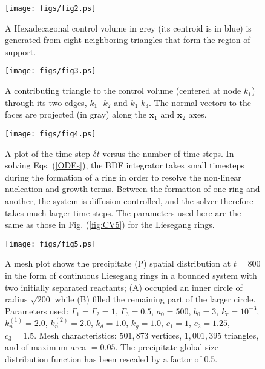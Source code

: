 \documentclass[aps,preprint]{revtex4}
\begin{document}







\newpage
\begin{figure}[htb]
\begin{center}
\texttt{[image: figs/fig2.ps]}
\end{center}
\caption{A Hexadecagonal control volume in grey (its centroid is in blue) is
generated from eight neighboring triangles that form the region of support.}
\label{fig:CV1}
\end{figure}

\begin{figure}[htb]
\begin{center}
\texttt{[image: figs/fig3.ps]}
\end{center}
\caption{A contributing triangle to the control volume (centered at node
$k_{1}$) through its two edges, $k_{1}$- $k_{2}$ and $k_{1}$-$k_{3}$. The
normal vectors to the faces are projected (in gray) along the $\mathbf{x}_{1}$
and $\mathbf{x}_{2}$ axes.}
\label{fig:CV2}
\end{figure}

\begin{figure}[htb]
\begin{center}
\texttt{[image: figs/fig4.ps]}
\end{center}
\caption{A plot of the time step $\delta t$ versus the number of time steps.
In solving Eqs. (\ref{ODEs}), the BDF integrator takes small timesteps during
the formation of a ring in order to resolve the non-linear nucleation and
growth terms. Between the formation of one ring and another, the system is
diffusion controlled, and the solver therefore takes much larger time steps.
The parameters used here are the same as those in Fig. (\ref{fig:CV5}) for the
Liesegang rings.}
\label{fig:BDF}
\end{figure} 

\begin{figure}[htb]
\begin{center}
\texttt{[image: figs/fig5.ps]}
\end{center}
\caption{A mesh plot shows the precipitate (P) spatial distribution at $t
=800$ in the form of continuous Liesegang rings in a bounded system with two
initially separated reactants; (A) occupied an inner circle of radius
$\sqrt{200}$ while (B) filled the remaining part of the larger circle.
Parameters used: ${\Gamma} _{1}={\Gamma}_{2}=1$, ${\Gamma}_{3}=0.5$,
$a_{0}=500$, $b_{0}=3$, $k_{r}=10^{-3}$, $k_{n}^{(1)} = 2.0$, $k_{n}^{(2)} =
2.0$, $k_{d} = 1.0$, $k_{g} = 1.0$, $c_{1} = 1$, $c_{2} = 1.25$, $c_{3} =
1.5$. Mesh characteristics: $501,873$ vertices, $1,001,395$ triangles, and of
maximum area $= 0.05$. The precipitate global size distribution function has
been rescaled by a factor of 0.5.}
\label{fig:CV4}
\end{figure}
\end{document}
